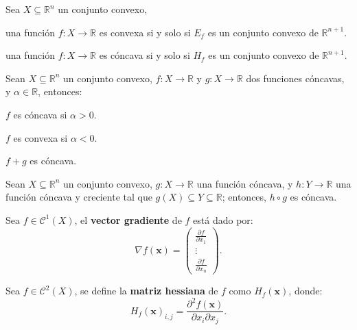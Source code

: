 \documentclass[8pt,a4paper]{extarticle}
\begin{document}
\begin{multicols}{3}
\begin{boxtheo}
	Sea $X \subseteq \mathbb{R}^n$ un conjunto convexo,
	\begin{eqlist}
	\item una función $f : X \to \mathbb{R}$ es convexa si y solo si $E_f$ es un conjunto convexo de $\mathbb{R}^{n+1}$.
	\item una función $f : X \to \mathbb{R}$ es cóncava si y solo si $H_f$ es un conjunto convexo de $\mathbb{R}^{n+1}$.
	\end{eqlist}
\end{boxtheo}

\begin{boxprop}
	Sean $X \subseteq \mathbb{R}^n$ un conjunto convexo, $f : X \to \mathbb{R}$ y $g : X \to \mathbb{R}$ dos funciones cóncavas, y $\alpha \in \mathbb{R}$, entonces:
	\begin{eqlist}
	\item $f$ es cóncava si $\alpha > 0$.
	\item $f$ es convexa si $\alpha < 0$.
	\item $f+g$ es cóncava.
	\end{eqlist}
\end{boxprop}

\begin{boxprop}
	Sean $X \subseteq \mathbb{R}^n$ un conjunto convexo, $g : X \to \mathbb{R}$ una función cóncava, y $h : Y \to \mathbb{R}$ una función cóncava y creciente tal que $g(X) \subseteq Y \subseteq \mathbb{R}$; entonces, $h \circ g$ es cóncava.
\end{boxprop}

\begin{boxdef}
	Sea $f \in \mathcal{C}^1 (X)$, el \textbf{vector gradiente} de $f$ está dado por:
	\[
		\nabla f(\mathbf{x}) =
		\begin{pmatrix} \displaystyle \frac{\partial f}{\partial x_1} \\ \vdots \\ \displaystyle \frac{\partial f}{\partial x_n} \end{pmatrix} 
	.\] 
\end{boxdef}

\begin{boxdef}
	Sea $f \in \mathcal{C}^2 (X)$, se define la \textbf{matriz hessiana} de $f$ como $H_f(\mathbf{x})$, donde:
	\[
		H_f (\mathbf{x})_{i,j} = \frac{\partial^2 f(\mathbf{x})}{\partial x_i \partial x_j} 
	.\] 
\end{boxdef}


\end{multicols}
\end{document}
